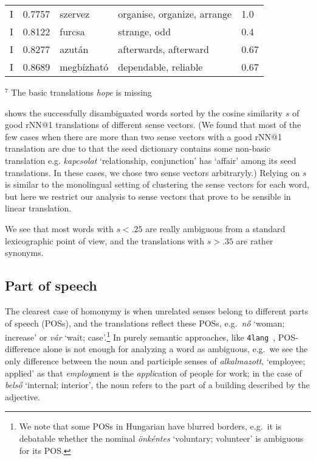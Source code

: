 \documentclass[11pt]{article}
\newcommand{\fl}{\texttt{4lang}}
\newcommand{\todo}[1]{}
\begin{document}
\begin{table*}
{\begin{tabular}{lllll}
    I	& 0.7757	& szervez	& organise, organize, arrange	& 1.0 \\
    I	& 0.8122	& furcsa	& strange, odd	& 0.4 \\
    I	& 0.8277	& azután	& afterwards, afterward	& 0.67 \\
    I	& 0.8689	& megbízható	& dependable, reliable	& 0.67 \\
    \bottomrule
  \end{tabular}
    }
  \caption{Hungarian words with the rNN@1 translations of their sense vectors.
  The first column is a post-hoc annotation by András Kornai (\emph E error in
  translation, \emph I identical, \emph S separate meanings), $s$ is the cosine
  similarity of the translations, and \emph{covg} denotes the coverage of the
  @1 translations over all gold translations.}
  \label{tab:alkoto} 
  {\footnotesize $^7$ The basic translations \emph{hope} is missing}
    \end{table*}

 shows the successfully disambiguated words sorted by the
cosine similarity $s$ of good rNN@1 translations of different sense vectors. (We
found that most of the few cases when there are more than two sense vectors
with a good rNN@1 translation are due to that the seed dictionary contains some
non-basic translation e.g. \emph{kapcsolat} `relationship, conjunction' has
`affair' among its seed translations. In these cases, we chose two sense
vectors arbitraryly.\todo{When there are sense vectors with more than two
rNN@$k$ hits , the choice of the corresponding target words is also
arbitrary.})  Relying on $s$ is similar to the monolingual setting of
clustering the sense vectors for each word, but here we restrict our analysis
to sense vectors that prove to be sensible in linear translation.

We see that most words with $s<.25$ are really ambiguous from a standard
lexicographic point of view, and the translations with $s>.35$ are rather
synonyms.


\subsection{Part of speech}

The clearest case of homonymy is when unrelated senses belong to different
parts of speech (POSs), and the translations reflect these POSs, e.g.~\emph{nő}
`woman; increase' or \emph{vár} \todo{update examples} `wait;
case'.\footnote{We note that some POSs in Hungarian have blurred borders,
e.g.~it is debatable whether the nominal \emph{önkéntes} `voluntary; volunteer'
is ambiguous for its POS.} In purely semantic approaches, like
\fl~\citep{Kornai:2017,Kornai:2015a}, POS-difference alone is not enough for
analyzing a word as ambiguous, e.g.~we see the only difference between the noun
and participle senses of \emph{alkalmazott}, `employee; applied' as that
\emph{employ}ment is the \emph{appli}cation of people for work; in the case of
\emph{belső} `internal; interior', the noun refers to the part of a building
described by the adjective.
\end{document}
